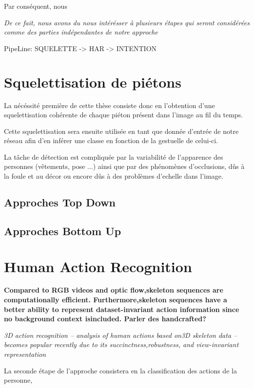 Par conséquent, nous 

\textit{De ce fait, nous avons du nous intérésser à plusieurs étapes qui seront considérées comme des parties indépendantes de notre approche}


PipeLine: SQUELETTE -> HAR -> INTENTION

\section{Squelettisation de piétons}
La nécéssité première de cette thèse consiste donc en l'obtention d'une squelettisation cohérente de chaque piéton présent dans l'image au fil du temps.

Cette squelettisation sera ensuite utilisée en tant que donnée d'entrée de notre réseau afin d'en inférer une classe en fonction de la gestuelle de celui-ci.

La tâche de détection est compliquée par la variabilité de l’apparence des personnes (vêtements, pose ...)
ainsi que par des phénomènes d’occlusions, dûs à la foule et au décor ou encore dûs à des problèmes d'echelle dans l'image.




\label{subsec:SQUEL}
\subsection{Approches Top Down}
\subsection{Approches Bottom Up}

\section{Human Action Recognition}

\textbf{ Compared to RGB videos and optic flow,skeleton sequences are computationally efficient. Furthermore,skeleton  sequences  have  a  better  ability  to  represent  dataset-invariant  action  information  since  no  background  context  isincluded.
Parler des handcrafted?}

\textit{3D action recognition – analysis of human actions based on3D  skeleton  data  –  becomes  popular  recently  due  to  its  succinctness,robustness, and view-invariant representation}

La seconde étape de l'approche consistera en la classification des actions de la personne,

